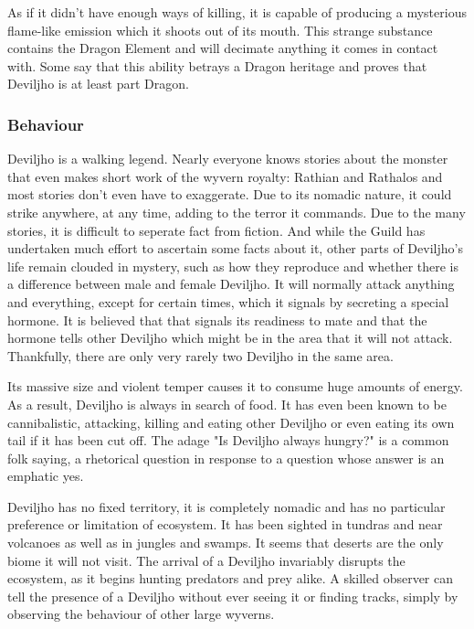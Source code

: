 As if it didn't have enough ways of killing, it is capable of producing a mysterious flame-like emission which it shoots out of its mouth. This strange substance contains the Dragon Element and will decimate anything it comes in contact with. Some say that this ability betrays a Dragon heritage and proves that Deviljho is at least part Dragon.

\subsubsection{Behaviour}
Deviljho is a walking legend. Nearly everyone knows stories about the monster that even makes short work of the wyvern royalty: Rathian and Rathalos and most stories don't even have to exaggerate. Due to its nomadic nature, it could strike anywhere, at any time, adding to the terror it commands. Due to the many stories, it is difficult to seperate fact from fiction. And while the Guild has undertaken much effort to ascertain some facts about it, other parts of Deviljho's life remain clouded in mystery, such as how they reproduce and whether there is a difference between male and female Deviljho. It will normally attack anything and everything, except for certain times, which it signals by secreting a special hormone. It is believed that that signals its readiness to mate and that the hormone tells other Deviljho which might be in the area that it will not attack. Thankfully, there are only very rarely two Deviljho in the same area.

Its massive size and violent temper causes it to consume huge amounts of energy. As a result, Deviljho is always in search of food. It has even been known to be cannibalistic, attacking, killing and eating other Deviljho or even eating its own tail if it has been cut off. The adage "Is Deviljho always hungry?" is a common folk saying, a rhetorical question in response to a question whose answer is an emphatic yes.

Deviljho has no fixed territory, it is completely nomadic and has no particular preference or limitation of ecosystem. It has been sighted in tundras and near volcanoes as well as in jungles and swamps. It seems that deserts are the only biome it will not visit. The arrival of a Deviljho invariably disrupts the ecosystem, as it begins hunting predators and prey alike. A skilled observer can tell the presence of a Deviljho without ever seeing it or finding tracks, simply by observing the behaviour of other large wyverns.

